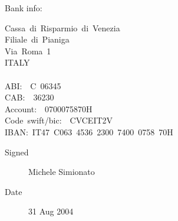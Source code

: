 \documentclass[10pt,english]{article}
\begin{document}
Bank info:
\begin{ttfamily}\begin{flushleft}
\mbox{Cassa~di~Risparmio~di~Venezia}\\
\mbox{Filiale~di~Pianiga}\\
\mbox{Via~Roma~1}\\
\mbox{ITALY}\\
\mbox{}\\
\mbox{ABI:~~C~06345}\\
\mbox{CAB:~~36230}\\
\mbox{Account:~~0700075870H~}\\
\mbox{Code~swift/bic:~~CVCEIT2V~}\\
\mbox{IBAN:~IT47~C063~4536~2300~7400~0758~70H}
\end{flushleft}\end{ttfamily}
\begin{description}
\item[Signed]

Michele Simionato

\item[Date]

31 Aug 2004

\end{description}
\end{document}
